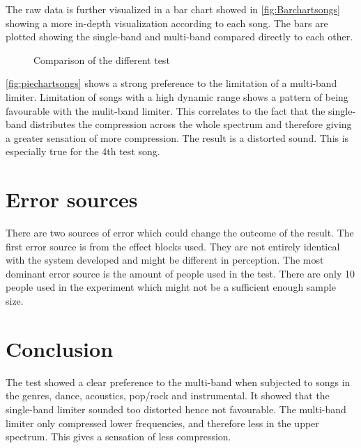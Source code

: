 The raw data is further visualized in a bar chart showed in \autoref{fig:Barchartsongs} showing a more in-depth visualization according to each song. The bars are plotted showing the single-band and multi-band compared directly to each other.
\begin{figure}[H]
\centering
{}
\caption{Comparison of the different test}
\label{fig:Barchartsongs}
\end{figure}

\autoref{fig:piechartsongs} shows a strong preference to the limitation of a multi-band limiter. Limitation of songs with a high dynamic range shows a pattern of being favourable with the mulit-band limiter. This correlates to the fact that the single-band distributes the compression across the whole spectrum and therefore giving a greater sensation of more compression. The result is a distorted sound. This is especially true for the 4th test song.


\section{Error sources}

There are two sources of error which could change the outcome of the result. The first error source is from the effect blocks used. They are not entirely identical with the system developed and might be different in perception. The most dominant error source is the amount of people used in the test. There are only 10 people used in the experiment which might not be a sufficient enough sample size.

\section{Conclusion}

The test showed a clear preference to the multi-band when subjected to songs in the genres, dance, acoustics, pop/rock and instrumental. It showed that the single-band limiter sounded too distorted hence not favourable. The multi-band limiter only compressed lower frequencies, and therefore less in the upper spectrum. This gives a sensation of less compression.



